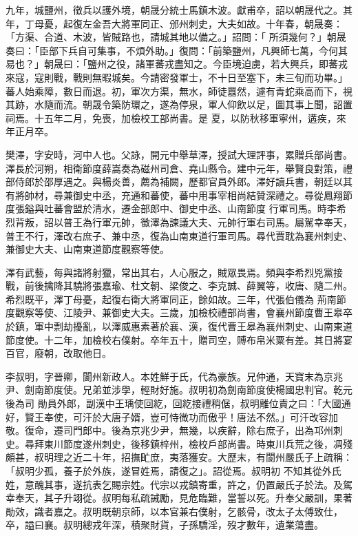 \begin{pinyinscope}
 九年，城鹽州，徵兵以護外境，朝晟分統士馬鎮木波。獻甫卒，詔以朝晟代之。其年，丁母憂，起復左金吾大將軍同正、邠州刺史，大夫如故。十年春，朝晟奏：「方渠、合道、木波，皆賊路也，請城其地以備之。」詔問：「
 所須幾何？」朝晟奏曰：「臣部下兵自可集事，不煩外助。」復問：「前築鹽州，凡興師七萬，今何其易也？」朝晟曰：「鹽州之役，諸軍蕃戎盡知之。今臣境迫虜，若大興兵，即蕃戎來寇，寇則戰，戰則無暇城矣。今請密發軍士，不十日至塞下，未三旬而功畢。」蕃人始乘障，數日而退。初，軍次方渠，無水，師徒囂然，遽有青蛇乘高而下，視其跡，水隨而流。朝晟令築防環之，遂為停泉，軍人仰飲以足，圖其事上聞，詔置祠焉。十五年二月，免喪，加檢校工部尚書。是
 夏，以防秋移軍寧州，遘疾，來年正月卒。



 樊澤，字安時，河中人也。父詠，開元中舉草澤，授試大理評事，累贈兵部尚書。澤長於河朔，相衛節度薛嵩奏為磁州司倉、堯山縣令。建中元年，舉賢良對策，禮部侍郎於邵厚遇之。與楊炎善，薦為補闕，歷都官員外郎。澤好讀兵書，朝廷以其有將帥材，尋兼御史中丞，充通和蕃使，蕃中用事宰相尚結贊深禮之。尋從鳳翔節度張鎰與吐蕃會盟於清水，遷金部郎中、御史中丞、山南節度
 行軍司馬。時李希烈背叛，詔以普王為行軍元帥，徵澤為諫議大夫、元帥行軍右司馬。屬駕幸奉天，普王不行，澤改右庶子、兼中丞，復為山南東道行軍司馬。尋代賈耽為襄州刺史、兼御史大夫、山南東道節度觀察等使。



 澤有武藝，每與諸將射獵，常出其右，人心服之，賊眾畏焉。頻與李希烈兇黨接戰，前後擒降其驍將張嘉瑜、杜文朝、梁俊之、李克誠、薛翼等，收唐、隨二州。希烈既平，澤丁母憂，起復右衛大將軍同正，餘如故。三年，代張伯儀為
 荊南節度觀察等使、江陵尹、兼御史大夫。三歲，加檢校禮部尚書，會襄州節度曹王皋卒於鎮，軍中剽劫擾亂，以澤威惠素著於襄、漢，復代曹王皋為襄州刺史、山南東道節度使。十二年，加檢校右僕射。卒年五十，贈司空，賻布帛米粟有差。其日將宴百官，廢朝，改取他日。



 李叔明，字晉卿，閬州新政人。本姓鮮于氏，代為豪族。兄仲通，天寶末為京兆尹、劍南節度使。兄弟並涉學，輕財好施。叔明初為劍南節度使楊國忠判官。乾元後為司
 勛員外郎，副漢中王瑀使回紇，回紇接禮稍倨，叔明離位責之曰：「大國通好，賢王奉使，可汗於大唐子婿，豈可恃微功而傲乎！唐法不然。」可汗改容加敬。復命，遷司門郎中。後為京兆少尹，無幾，以疾辭，除右庶子，出為邛州刺史。尋拜東川節度遂州刺史，後移鎮梓州，檢校戶部尚書。時東川兵荒之後，凋殘頗甚，叔明理之近二十年，招撫甿庶，夷落獲安。大歷末，有閬州嚴氏子上疏稱：「叔明少孤，養子於外族，遂冒姓焉，請復之」。詔從焉。叔明初
 不知其從外氏姓，意醜其事，遂抗表乞賜宗姓。代宗以戎鎮寄重，許之，仍置嚴氏子於法。及駕幸奉天，其子升翊從。叔明每私疏誡勵，見危臨難，當誓以死。升奉父嚴訓，果著勛效，識者嘉之。叔明既朝京師，以本官兼右僕射，乞骸骨，改太子太傅致仕，卒，謚曰襄。叔明總戎年深，積聚財貨，子孫驕淫，歿才數年，遺業蕩盡。




\end{pinyinscope}
